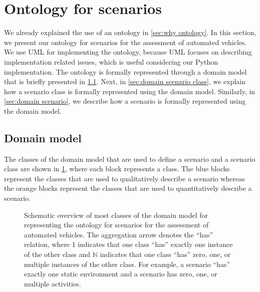 \section{Ontology for scenarios}
\label{sec:ontology}

We already explained the use of an ontology in \cref{sec:why ontology}. In this section, we present our ontology for scenarios for the assessment of automated vehicles. 
We use UML for implementing the ontology, because UML focuses on describing implementation related issues, which is useful considering our Python implementation.
The ontology is formally represented through a domain model that is briefly presented in \cref{sec:domain model}. Next, in \cref{sec:domain scenario class}, we explain how a scenario class is formally represented using the domain model. Similarly, in \cref{sec:domain scenario}, we describe how a scenario is formally represented using the domain model. 



\subsection{Domain model}
\label{sec:domain model}

The classes of the domain model that are used to define a scenario and a scenario class are shown in \cref{fig:ontology classes}, where each block represents a class. The blue blocks represent the classes that are used to qualitatively describe a scenario whereas the orange blocks represent the classes that are used to quantitatively describe a scenario. 

\begin{figure}
	\centering
	
	\caption{\cbstart Schematic overview of most classes of the domain model for representing the ontology for scenarios for the assessment of automated vehicles. The aggregation arrow denotes the ``has'' relation, where $1$ indicates that one class ``has'' exactly one instance of the other class and $\mathbb{N}$ indicates that one class ``has'' zero, one, or multiple instances of the other class. For example, a scenario ``has'' exactly one static environment and a scenario has zero, one, or multiple activities.\cbend}
	\label{fig:ontology classes}
\end{figure}

